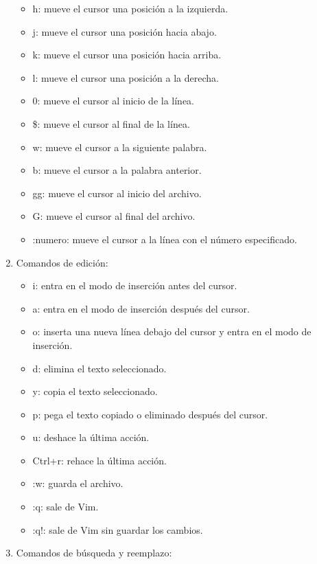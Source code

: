 \documentclass[
  letterpaper,
  DIV=11,
  numbers=noendperiod]{scrartcl}
\providecommand{\tightlist}{%
  \setlength{\itemsep}{0pt}\setlength{\parskip}{0pt}}\usepackage{longtable,booktabs,array}
\begin{document}
\begin{enumerate}
  \begin{itemize}
  \tightlist
  \item
    h: mueve el cursor una posición a la izquierda.
  \item
    j: mueve el cursor una posición hacia abajo.
  \item
    k: mueve el cursor una posición hacia arriba.
  \item
    l: mueve el cursor una posición a la derecha.
  \item
    0: mueve el cursor al inicio de la línea.
  \item
    \$: mueve el cursor al final de la línea.
  \item
    w: mueve el cursor a la siguiente palabra.
  \item
    b: mueve el cursor a la palabra anterior.
  \item
    gg: mueve el cursor al inicio del archivo.
  \item
    G: mueve el cursor al final del archivo.
  \item
    :numero: mueve el cursor a la línea con el número especificado.
  \end{itemize}
\item
  Comandos de edición:

  \begin{itemize}
  \tightlist
  \item
    i: entra en el modo de inserción antes del cursor.
  \item
    a: entra en el modo de inserción después del cursor.
  \item
    o: inserta una nueva línea debajo del cursor y entra en el modo de
    inserción.
  \item
    d: elimina el texto seleccionado.
  \item
    y: copia el texto seleccionado.
  \item
    p: pega el texto copiado o eliminado después del cursor.
  \item
    u: deshace la última acción.
  \item
    Ctrl+r: rehace la última acción.
  \item
    :w: guarda el archivo.
  \item
    :q: sale de Vim.
  \item
    :q!: sale de Vim sin guardar los cambios.
  \end{itemize}
\item
  Comandos de búsqueda y reemplazo:


\end{enumerate}
\end{document}
